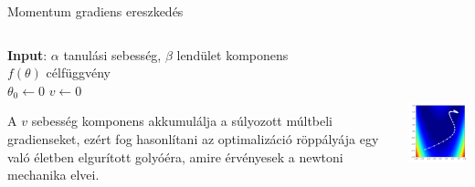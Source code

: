 \documentclass[english, aspectratio=169]{beamer}
\begin{document}
\begin{frame}{Momentum gradiens ereszkedés}
\begin{columns}
\begin{column}{.7\textwidth}
\begin{algorithm}[H]
\SetAlgoLined
\caption{Momentum gradiens ereszkedés}
\textbf{Input}: $\alpha$ tanulási sebesség, $\beta$ lendület komponens\\
$f(\theta)$ célfüggvény\\
$\theta_0 \leftarrow 0$
$v \leftarrow 0$
\end{algorithm}
A $v$ sebesség komponens akkumulálja a súlyozott múltbeli gradienseket, ezért fog hasonlítani az optimalizáció röppályája egy való életben elgurított golyóéra, amire érvényesek a newtoni mechanika elvei. 
\end{column}
\begin{column}{.3\textwidth}
\begin{center}
\includegraphics[width=5cm, height=5cm, keepaspectratio]{images/gd_momentum.png}
\end{center}
\end{column}
\end{columns}
\end{frame}
\end{document}
